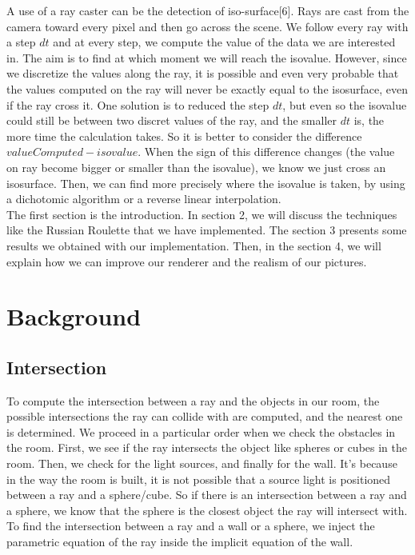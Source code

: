 \documentclass[12pt]{article}
\numberwithin{equation}{section}
\begin{document}
A use of a ray caster can be the detection of iso-surface[6]. Rays are cast from the camera toward every pixel and then go across the scene. We follow every ray with a step $dt$ and at every step, we compute the value of the data we are interested in. The aim is to find at which moment we will reach the isovalue. However, since we discretize the values along the ray, it is possible and even very probable that the values computed on the ray will never be exactly equal to the isosurface, even if the ray cross it. One solution is to reduced the step $dt$, but even so the isovalue could still be between two discret values of the ray, and the smaller $dt$ is, the more time the calculation takes. So it is better to consider the difference $valueComputed - isovalue$. When the sign of this difference changes (the value on ray become bigger or smaller than the isovalue), we know we just cross an isosurface. Then, we can find more precisely where the isovalue is taken, by using a dichotomic algorithm or a reverse linear interpolation.\\

The first section is the introduction. In section 2, we will discuss the techniques like the Russian Roulette that we have implemented. The section 3 presents some results we obtained with our implementation. Then, in the section 4, we will explain how we can improve our renderer and the realism of our pictures. 

\section{Background}

\subsection{Intersection}


To compute the intersection between a ray and the objects in our room, the possible intersections the ray can collide with are computed, and the nearest one is determined. We proceed in a particular order when we check the obstacles in the room. First, we see if the ray intersects the object like spheres or cubes in the room. Then, we check for the light sources, and finally for the wall. It's because in the way the room is built, it is not possible that a source light is positioned between a ray and a sphere/cube. So if there is an intersection between a ray and a sphere, we know that the sphere is the closest object the ray will intersect with. To find the intersection between a ray and a wall or a sphere, we inject the parametric equation of the ray inside the implicit equation of the wall.
\end{document}
